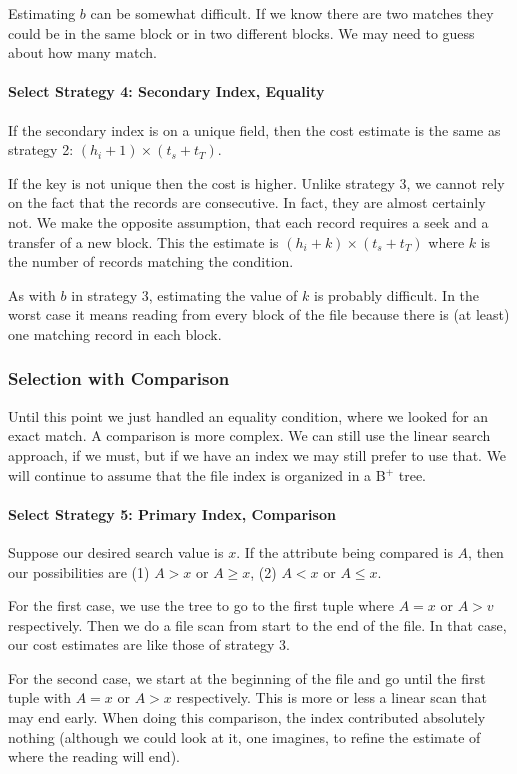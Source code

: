 Estimating $b$ can be somewhat difficult. If we know there are two matches they could be in the same block or in two different blocks. We may need to guess about how many match.

\paragraph{Select Strategy 4: Secondary Index, Equality}
If the secondary index is on a unique field, then the cost estimate is the same as strategy 2:  $(h_{i} + 1) \times (t_{s} + t_{T})$.

If the key is not unique then the cost is higher. Unlike strategy 3, we cannot rely on the fact that the records are consecutive. In fact, they are almost certainly not. We make the opposite assumption, that each record requires a seek and a transfer of a new block. This the estimate is $(h_{i} + k) \times (t_{s} + t_{T})$ where $k$ is the number of records matching the condition.

As with $b$ in strategy 3, estimating the value of $k$ is probably difficult. In the worst case it means reading from every block of the file because there is (at least) one matching record in each block.

\subsubsection*{Selection with Comparison}

Until this point we just handled an equality condition, where we looked for an exact match. A comparison is more complex. We can still use the linear search approach, if we must, but if we have an index we may still prefer to use that. We will continue to assume that the file index is organized in a B$^{+}$ tree.

\paragraph{Select Strategy 5: Primary Index, Comparison}
Suppose our desired search value is $x$. If the attribute being compared is $A$, then our possibilities are (1) $A > x$ or $A \geq x$, (2) $A < x$ or $A \leq x$.

For the first case, we use the tree to go to the first tuple where $A = x$ or $A > v$ respectively. Then we do a file scan from start to the end of the file. In that case, our cost estimates are like those of strategy 3.

For the second case, we start at the beginning of the file and go until the first tuple with $A = x$ or $A > x$ respectively. This is more or less a linear scan that may end early. When doing this comparison, the index contributed absolutely nothing (although we could look at it, one imagines, to refine the estimate of where the reading will end).


